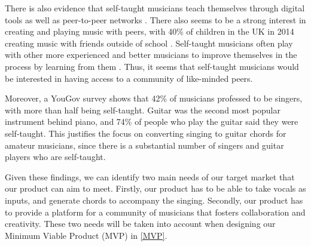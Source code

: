 There is also evidence that self-taught musicians teach themselves through digital tools as well as peer-to-peer networks \cite{abrsm2014} \cite{bookreview}. There also seems to be a strong interest in creating and playing music with peers, with 40\% of children in the UK in 2014 creating music with friends outside of school \cite{abrsm2014}. Self-taught musicians often play with other more experienced and better musicians to improve themselves in the process by learning from them \cite{marketresearch5}. Thus, it seems that self-taught musicians would be interested in having access to a community of like-minded peers. 
 
Moreover, a YouGov survey \cite{YouGovMR} shows that 42\% of musicians professed to be singers, with more than half being self-taught. Guitar was the second most popular instrument behind piano, and 74\% of people who play the guitar said they were self-taught. This justifies the focus on converting singing to guitar chords for amateur musicians, since there is a substantial number of singers and guitar players who are self-taught.  

Given these findings, we can identify two main needs of our target market that our product can aim to meet. Firstly, our product has to be able to take vocals as inputs, and generate chords to accompany the singing. Secondly, our product has to provide a platform for a community of musicians that fosters collaboration and creativity. These two needs will be taken into account when designing our Minimum Viable Product (MVP) in \cref{MVP}.


